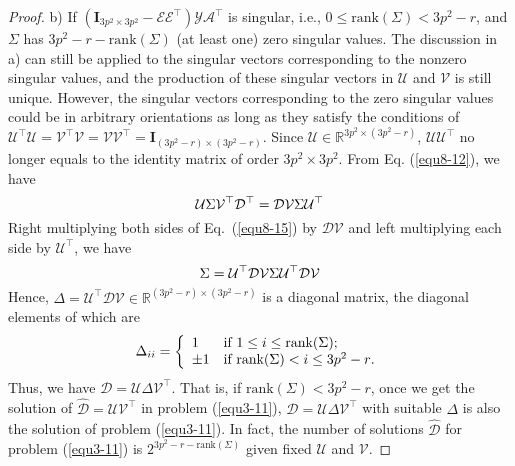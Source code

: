 \begin{proof}
b) If $(\bm{I}_{3p^2\times 3p^2}-\mathcal{E}\mathcal{E}^{\top})\mathcal{Y}\mathcal{A}^{\top}$ is singular, i.e.,  $0\le \text{rank}(\Sigma)< 3p^2-r$, and $\Sigma$ has $3p^2-r-\text{rank}(\Sigma)$ (at least one) zero singular values. The discussion in a) can still be applied to the singular vectors corresponding to the nonzero singular values, and the production of these singular vectors in $\mathcal{U}$ and $\mathcal{V}$ is still unique. However, the singular vectors corresponding to the zero singular values could be in arbitrary orientations as long as they satisfy the conditions of $\mathcal{U}^{\top}\mathcal{U}=\mathcal{V}^{\top}\mathcal{V}=\mathcal{V}\mathcal{V}^{\top}=\bm{I}_{(3p^2-r)\times (3p^2-r)}$. Since $\mathcal{U}\in \mathbb{R}^{3p^2\times (3p^2-r)}$, $\mathcal{U}\mathcal{U}^{\top}$ no longer equals to the identity matrix of order $3p^2\times 3p^2$. From Eq. (\ref{equ8-12}), we have
\begin{equation}
\label{equ8-15}
\mathcal{U}\Sigma\mathcal{V}^{\top}\mathcal{D}^{\top}
=
\mathcal{D}\mathcal{V}\Sigma\mathcal{U}^{\top}
\vspace{-2mm}
\end{equation}
Right multiplying both sides of Eq.\ (\ref{equ8-15}) by $\mathcal{D}\mathcal{V}$ and left multiplying each side by $\mathcal{U}^{\top}$, we have
\begin{equation}\label{equ8-16}
\Sigma
=
\mathcal{U}^{\top}\mathcal{D}\mathcal{V}\Sigma\mathcal{U}^{\top}\mathcal{D}\mathcal{V}
\vspace{-2mm}
\end{equation}
Hence, $\Delta=\mathcal{U}^{\top}\mathcal{D}\mathcal{V}\in\mathbb{R}^{(3p^2-r)\times (3p^2-r)}$ is a diagonal matrix, the diagonal elements of which are 
\vspace{-1mm}
\begin{displaymath}
\Delta_{ii}= \left\{ \begin{array}{ll}
1 & \textrm{if $1\le i\le \text{rank}(\Sigma)$};\\
\pm 1 & \textrm{if $\text{rank}(\Sigma)< i \le 3p^2-r$}.\\
\end{array} \right.
\vspace{-1mm}
\end{displaymath}
Thus, we have $\mathcal{D}=\mathcal{U}\Delta\mathcal{V}^{\top}$. That is, if $\text{rank}(\Sigma)<3p^2-r$, once we get the solution of $\hat{\mathcal{D}}=\mathcal{U}\mathcal{V}^{\top}$ in problem (\ref{equ3-11}), $\mathcal{D}=\mathcal{U}\Delta\mathcal{V}^{\top}$ with suitable $\Delta$ is also the solution of problem (\ref{equ3-11}). In fact, the number of solutions $\hat{\mathcal{D}}$ for problem (\ref{equ3-11}) is $2^{3p^2-r-\text{rank}(\Sigma)}$ given fixed $\mathcal{U}$ and $\mathcal{V}$.
\end{proof}




